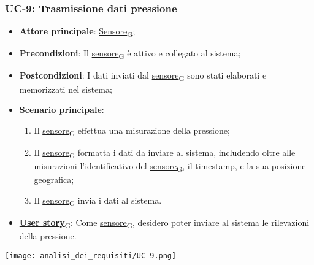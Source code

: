 \subsubsection{UC-9: Trasmissione dati pressione}
\begin{itemize}
	\item \textbf{Attore principale}: \href{https://7last.github.io/docs/rtb/documentazione-interna/glossario\#sensore}{Sensore\textsubscript{G}};
	\item \textbf{Precondizioni}: Il \href{https://7last.github.io/docs/rtb/documentazione-interna/glossario\#sensore}{sensore\textsubscript{G}} è attivo e collegato al sistema;
	\item \textbf{Postcondizioni}: I dati inviati dal \href{https://7last.github.io/docs/rtb/documentazione-interna/glossario\#sensore}{sensore\textsubscript{G}} sono stati elaborati e memorizzati nel sistema;
	\item \textbf{Scenario principale}:
	      \begin{enumerate}
		      \item Il \href{https://7last.github.io/docs/rtb/documentazione-interna/glossario\#sensore}{sensore\textsubscript{G}} effettua una misurazione della pressione;
		      \item Il \href{https://7last.github.io/docs/rtb/documentazione-interna/glossario\#sensore}{sensore\textsubscript{G}} formatta i dati da inviare al sistema, includendo oltre alle misurazioni l'identificativo del \href{https://7last.github.io/docs/rtb/documentazione-interna/glossario\#sensore}{sensore\textsubscript{G}},
		            il timestamp, e la sua posizione geografica;
		      \item Il \href{https://7last.github.io/docs/rtb/documentazione-interna/glossario\#sensore}{sensore\textsubscript{G}} invia i dati al sistema.
	      \end{enumerate}
	\item \href{https://7last.github.io/docs/rtb/documentazione-interna/glossario\#user-story}{\textbf{User story}\textsubscript{G}}: Come \href{https://7last.github.io/docs/rtb/documentazione-interna/glossario\#sensore}{sensore\textsubscript{G}}, desidero poter inviare al sistema le rilevazioni della pressione.
\end{itemize}

\begin{center}
	\texttt{[image: analisi\_dei\_requisiti/UC-9.png]}
\end{center}

